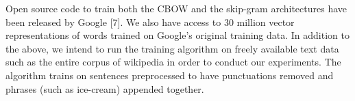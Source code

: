 Open source code to train both the CBOW and the skip-gram architectures have been released by Google [7]. 
We also have access to 30 million vector representations of words trained on Google’s original training data. 
In addition to the above, we intend to run the training algorithm on freely available text data such as the entire corpus of wikipedia in order to conduct our experiments. 
The algorithm trains on sentences preprocessed to have punctuations removed and phrases (such as ice-cream) appended together. 

